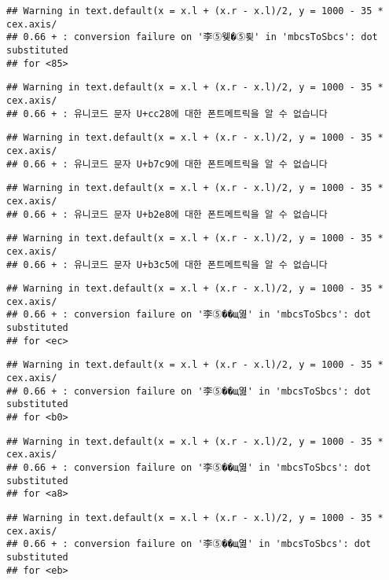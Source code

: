 \documentclass[]{article}
\begin{document}
\begin{verbatim}
## Warning in text.default(x = x.l + (x.r - x.l)/2, y = 1000 - 35 * cex.axis/
## 0.66 + : conversion failure on '李⑤웾�⑤룆' in 'mbcsToSbcs': dot substituted
## for <85>
\end{verbatim}

\begin{verbatim}
## Warning in text.default(x = x.l + (x.r - x.l)/2, y = 1000 - 35 * cex.axis/
## 0.66 + : 유니코드 문자 U+cc28에 대한 폰트메트릭을 알 수 없습니다
\end{verbatim}

\begin{verbatim}
## Warning in text.default(x = x.l + (x.r - x.l)/2, y = 1000 - 35 * cex.axis/
## 0.66 + : 유니코드 문자 U+b7c9에 대한 폰트메트릭을 알 수 없습니다
\end{verbatim}

\begin{verbatim}
## Warning in text.default(x = x.l + (x.r - x.l)/2, y = 1000 - 35 * cex.axis/
## 0.66 + : 유니코드 문자 U+b2e8에 대한 폰트메트릭을 알 수 없습니다
\end{verbatim}

\begin{verbatim}
## Warning in text.default(x = x.l + (x.r - x.l)/2, y = 1000 - 35 * cex.axis/
## 0.66 + : 유니코드 문자 U+b3c5에 대한 폰트메트릭을 알 수 없습니다
\end{verbatim}

\begin{verbatim}
## Warning in text.default(x = x.l + (x.r - x.l)/2, y = 1000 - 35 * cex.axis/
## 0.66 + : conversion failure on '李⑤��щ엺' in 'mbcsToSbcs': dot substituted
## for <ec>
\end{verbatim}

\begin{verbatim}
## Warning in text.default(x = x.l + (x.r - x.l)/2, y = 1000 - 35 * cex.axis/
## 0.66 + : conversion failure on '李⑤��щ엺' in 'mbcsToSbcs': dot substituted
## for <b0>
\end{verbatim}

\begin{verbatim}
## Warning in text.default(x = x.l + (x.r - x.l)/2, y = 1000 - 35 * cex.axis/
## 0.66 + : conversion failure on '李⑤��щ엺' in 'mbcsToSbcs': dot substituted
## for <a8>
\end{verbatim}

\begin{verbatim}
## Warning in text.default(x = x.l + (x.r - x.l)/2, y = 1000 - 35 * cex.axis/
## 0.66 + : conversion failure on '李⑤��щ엺' in 'mbcsToSbcs': dot substituted
## for <eb>
\end{verbatim}
\end{document}
